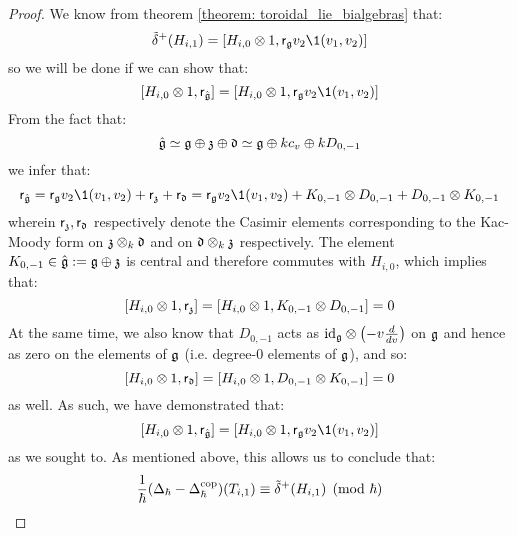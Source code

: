 \begin{proof}
                We know from theorem \ref{theorem: toroidal_lie_bialgebras} that:
                    $$\tilde{\delta}^{\positive}(H_{i, 1}) = [ H_{i, 0} \tensor 1, \sfr_{\g} v_2 \1(v_1, v_2) ]$$
                so we will be done if we can show that:
                    $$[H_{i, 0} \tensor 1, \sfr_{ \hat{\g} }] = [ H_{i, 0} \tensor 1, \sfr_{\g} v_2 \1(v_1, v_2) ]$$
                From the fact that:
                    $$\hat{\mathfrak{g}} \simeq \mathfrak{g} \oplus \mathfrak{z} \oplus \mathfrak{d} \simeq \mathfrak{g} \oplus k c_v \oplus k D_{0, -1}$$
                we infer that:
                    $$\sfr_{ \hat{\g} } = \sfr_{\g} v_2 \1(v_1, v_2) + \sfr_{\z} + \sfr_{\d} = \sfr_{\g} v_2 \1(v_1, v_2) + K_{0, -1} \tensor D_{0, -1} + D_{0, -1} \tensor K_{0, -1}$$
                wherein $\mathsf{r}_{\mathfrak{z}}, \mathsf{r}_{\mathfrak{d}}$ respectively denote the Casimir elements corresponding to the Kac-Moody form on $\z \tensor_k \d$ and on $\d \tensor_k \z$ respectively. The element $K_{0, -1} \in \hat{\mathfrak{g}} := \mathfrak{g} \oplus \mathfrak{z}$ is central and therefore commutes with $H_{i, 0}$, which implies that:
                    $$[H_{i, 0} \tensor 1, \sfr_{\z}] = [H_{i, 0} \tensor 1, K_{0, -1} \tensor D_{0, -1}] = 0$$
                At the same time, we also know that $D_{0, -1}$ acts as $\id_{\g} \tensor \left(-v \frac{d}{dv}\right)$ on $\mathfrak{g}$ and hence as zero on the elements of $\mathfrak{g}$ (i.e. degree-$0$ elements of $\mathfrak{g}$), and so:
                    $$[H_{i, 0} \tensor 1, \sfr_{\d}] = [H_{i, 0} \tensor 1, D_{0, -1} \tensor K_{0, -1}] = 0$$
                as well. As such, we have demonstrated that:
                    $$[H_{i, 0} \tensor 1, \sfr_{ \hat{\g} }] = [ H_{i, 0} \tensor 1, \sfr_{\g} v_2 \1(v_1, v_2) ]$$
                as we sought to. As mentioned above, this allows us to conclude that:
                    $$\frac{1}{\hbar}( \Delta_{\hbar} - \Delta_{\hbar}^{\mathrm{cop}} )(T_{i, 1}) \equiv \tilde{\delta}^{+}(H_{i, 1}) \pmod{\hbar}$$
            \end{proof}